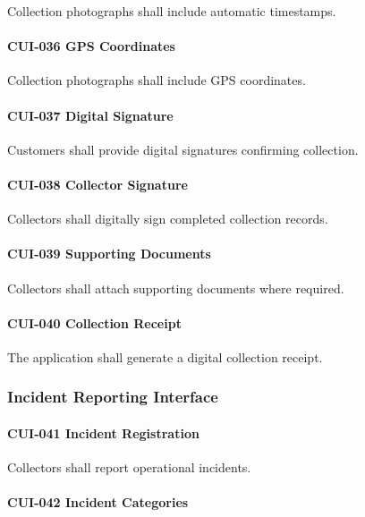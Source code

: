 Collection photographs shall include automatic timestamps.

\paragraph{CUI-036 GPS Coordinates}

Collection photographs shall include GPS coordinates.

\paragraph{CUI-037 Digital Signature}

Customers shall provide digital signatures confirming collection.

\paragraph{CUI-038 Collector Signature}

Collectors shall digitally sign completed collection records.

\paragraph{CUI-039 Supporting Documents}

Collectors shall attach supporting documents where required.

\paragraph{CUI-040 Collection Receipt}

The application shall generate a digital collection receipt.


\subsubsection*{Incident Reporting Interface}

\paragraph{CUI-041 Incident Registration}

Collectors shall report operational incidents.

\paragraph{CUI-042 Incident Categories}

